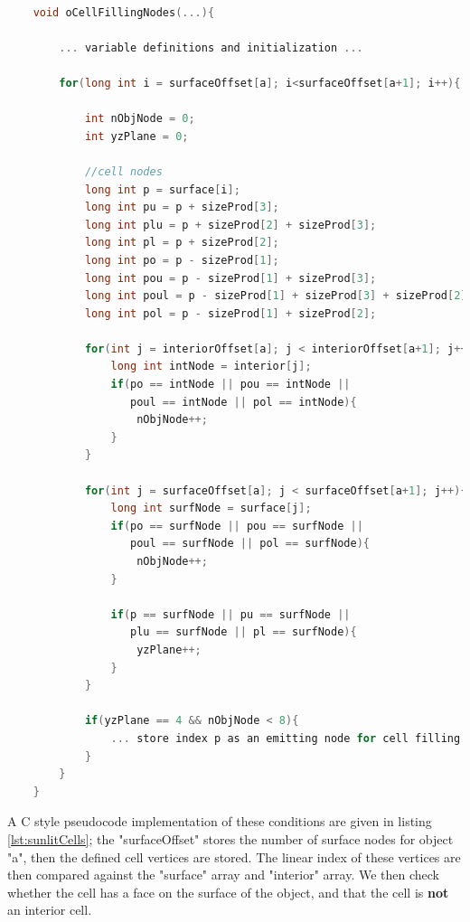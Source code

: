 \begin{minipage}{\linewidth}
    \begin{lstlisting}[language=C, caption={C pseudocode for finding cells adjacent
    to sunlit object surfaces},
    label={lst:sunlitCells}]
    
    void oCellFillingNodes(...){
        
        ... variable definitions and initialization ...
    
        for(long int i = surfaceOffset[a]; i<surfaceOffset[a+1]; i++){
                    
            int nObjNode = 0;
            int yzPlane = 0;        
          
            //cell nodes
            long int p = surface[i];
            long int pu = p + sizeProd[3];
            long int plu = p + sizeProd[2] + sizeProd[3];
            long int pl = p + sizeProd[2]; 
            long int po = p - sizeProd[1];
            long int pou = p - sizeProd[1] + sizeProd[3];
            long int poul = p - sizeProd[1] + sizeProd[3] + sizeProd[2];
            long int pol = p - sizeProd[1] + sizeProd[2];
        
            for(int j = interiorOffset[a]; j < interiorOffset[a+1]; j++){
                long int intNode = interior[j];
                if(po == intNode || pou == intNode ||
                   poul == intNode || pol == intNode){
                    nObjNode++;
                }
            }
        
            for(int j = surfaceOffset[a]; j < surfaceOffset[a+1]; j++){
                long int surfNode = surface[j];
                if(po == surfNode || pou == surfNode || 
                   poul == surfNode || pol == surfNode){
                    nObjNode++;
                }
        
                if(p == surfNode || pu == surfNode || 
                   plu == surfNode || pl == surfNode){
                    yzPlane++;
                }
            }
        
            if(yzPlane == 4 && nObjNode < 8){
                ... store index p as an emitting node for cell filling ...
            }
        }
    }
    \end{lstlisting}
\end{minipage}


A C style pseudocode implementation of these conditions are given in listing \ref{lst:sunlitCells}; the "surfaceOffset" stores the number of surface nodes for object "a", then the defined cell vertices are stored. The linear index of these vertices are then compared against the "surface" array and "interior" array. We then check whether the cell has a face on the surface of the object, and that the cell is \textbf{not} an interior cell.


